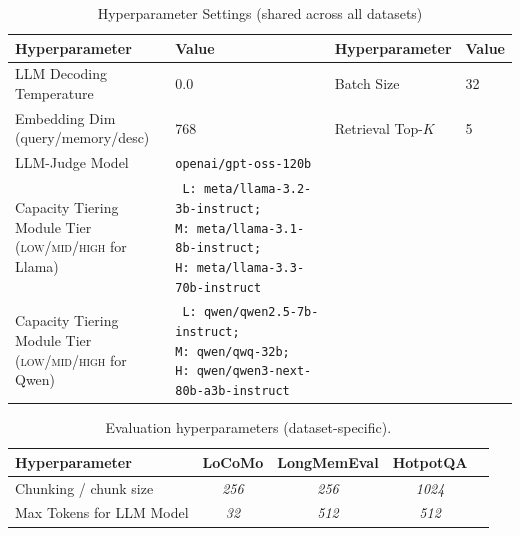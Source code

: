 
\begin{table}[htbp]
    \centering
    \caption{Hyperparameter Settings (shared across all datasets)}
    \label{tab:hparams_shared}
    \begin{tabularx}{0.95\textwidth}{@{}lX lX@{}}
        \toprule
        \textbf{Hyperparameter} & \textbf{Value} & \textbf{Hyperparameter} & \textbf{Value} \\
        \midrule
        LLM Decoding Temperature & 0.0 & Batch Size & 32 \\
        Embedding Dim (query/memory/desc) & 768  & Retrieval Top-$K$ & 5\\
         LLM-Judge Model & \texttt{\small openai/gpt-oss-120b} \\
        Capacity Tiering Module Tier (\textsc{low}/\textsc{mid}/\textsc{high} for Llama) &
{\raggedright\texttt{\small
L:\nobreak\ meta/llama-3.2-3b-instruct;\;
M:\nobreak\ meta/llama-3.1-8b-instruct;\;
H:\nobreak\ meta/llama-3.3-70b-instruct
}\par}  \\
Capacity Tiering Module Tier (\textsc{low}/\textsc{mid}/\textsc{high} for Qwen) &
{\raggedright\texttt{\small
L:\nobreak\ qwen/qwen2.5-7b-instruct;\;
M:\nobreak\ qwen/qwq-32b;\;
H:\nobreak\ qwen/qwen3-next-80b-a3b-instruct
}\par}  \\
        \bottomrule
    \end{tabularx}
\end{table}




\begin{table}[htbp]
    \centering
    \caption{Evaluation hyperparameters (dataset-specific).}
    \label{tab:hparams_eval}
        \begin{tabular}{lcccc}
        \toprule
        \textbf{Hyperparameter} & \textbf{LoCoMo} & \textbf{LongMemEval} & \textbf{HotpotQA} & \\
        \midrule
        Chunking / chunk size & \textit{256} & \textit{256} & \textit{1024}  \\
        Max Tokens for LLM Model & \textit{32} & \textit{512} & \textit{512}  \\
        \bottomrule
        \end{tabular}
\end{table}

